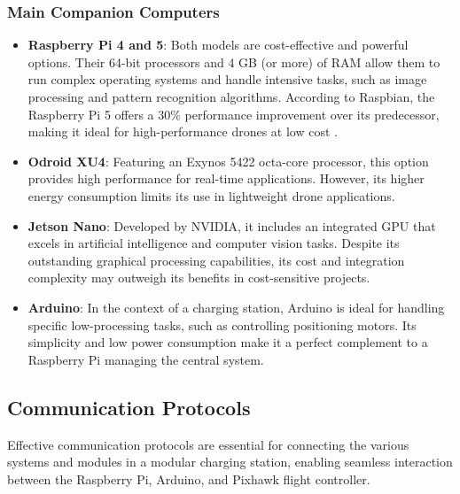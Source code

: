 \subsubsection{Main Companion Computers}
\begin{itemize}
    \item \textbf{Raspberry Pi 4 and 5}: Both models are cost-effective and powerful options. Their 64-bit processors and 4 GB (or more) of RAM allow them to run complex operating systems and handle intensive tasks, such as image processing and pattern recognition algorithms. According to Raspbian, the Raspberry Pi 5 offers a 30\% performance improvement over its predecessor, making it ideal for high-performance drones at low cost \cite{rasp_docs}.
    \item \textbf{Odroid XU4}: Featuring an Exynos 5422 octa-core processor, this option provides high performance for real-time applications. However, its higher energy consumption limits its use in lightweight drone applications.
    \item \textbf{Jetson Nano}: Developed by NVIDIA, it includes an integrated GPU that excels in artificial intelligence and computer vision tasks. Despite its outstanding graphical processing capabilities, its cost and integration complexity may outweigh its benefits in cost-sensitive projects.
    \item \textbf{Arduino}: In the context of a charging station, Arduino is ideal for handling specific low-processing tasks, such as controlling positioning motors. Its simplicity and low power consumption make it a perfect complement to a Raspberry Pi managing the central system.
\end{itemize}

\subsection{Communication Protocols}

Effective communication protocols are essential for connecting the various systems and modules in a modular charging station, enabling seamless interaction between the Raspberry Pi, Arduino, and Pixhawk flight controller.

